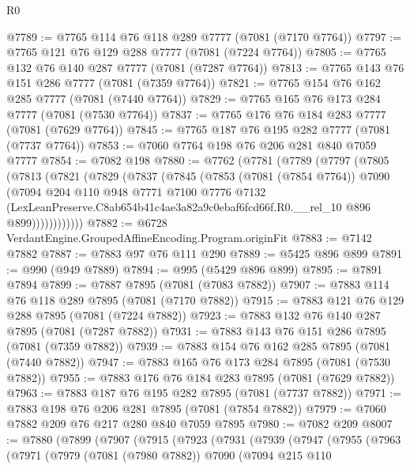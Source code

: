 \begin{lexlean}{R0}
\begin{coremodule}
@7789 := @7765 @114 @76 @118 @289 @7777 (@7081 (@7170 @7764))
@7797 := @7765 @121 @76 @129 @288 @7777 (@7081 (@7224 @7764))
@7805 := @7765 @132 @76 @140 @287 @7777 (@7081 (@7287 @7764))
@7813 := @7765 @143 @76 @151 @286 @7777 (@7081 (@7359 @7764))
@7821 := @7765 @154 @76 @162 @285 @7777 (@7081 (@7440 @7764))
@7829 := @7765 @165 @76 @173 @284 @7777 (@7081 (@7530 @7764))
@7837 := @7765 @176 @76 @184 @283 @7777 (@7081 (@7629 @7764))
@7845 := @7765 @187 @76 @195 @282 @7777 (@7081 (@7737 @7764))
@7853 := @7060 @7764 @198 @76 @206 @281 @840 @7059 @7777
@7854 := @7082 @198
@7880 := @7762
    (@7781
      (@7789
        (@7797
          (@7805
            (@7813
              (@7821
                (@7829
                  (@7837
                    (@7845
                      (@7853
                        (@7081 (@7854 @7764))
                        @7090
                        (@7094
                          @204
                          @110
                          @948
                          @7771
                          @7100
                          @7776
                          @7132
                          (LexLeanPreserve.C8ab654b41c4ae3a82a9c0ebaf6fcd66f.R0.__rel_10
                            @896
                            @899))))))))))))
@7882 := @6728 VerdantEngine.GroupedAffineEncoding.Program.originFit
@7883 := @7142 @7882
@7887 := @7883 @97 @76 @111 @290
@7889 := @5425 @896 @899
@7891 := @990 (@949 @7889)
@7894 := @995 (@5429 @896 @899)
@7895 := @7891 @7894
@7899 := @7887 @7895 (@7081 (@7083 @7882))
@7907 := @7883 @114 @76 @118 @289 @7895 (@7081 (@7170 @7882))
@7915 := @7883 @121 @76 @129 @288 @7895 (@7081 (@7224 @7882))
@7923 := @7883 @132 @76 @140 @287 @7895 (@7081 (@7287 @7882))
@7931 := @7883 @143 @76 @151 @286 @7895 (@7081 (@7359 @7882))
@7939 := @7883 @154 @76 @162 @285 @7895 (@7081 (@7440 @7882))
@7947 := @7883 @165 @76 @173 @284 @7895 (@7081 (@7530 @7882))
@7955 := @7883 @176 @76 @184 @283 @7895 (@7081 (@7629 @7882))
@7963 := @7883 @187 @76 @195 @282 @7895 (@7081 (@7737 @7882))
@7971 := @7883 @198 @76 @206 @281 @7895 (@7081 (@7854 @7882))
@7979 := @7060 @7882 @209 @76 @217 @280 @840 @7059 @7895
@7980 := @7082 @209
@8007 := @7880
    (@7899
      (@7907
        (@7915
          (@7923
            (@7931
              (@7939
                (@7947
                  (@7955
                    (@7963
                      (@7971
                        (@7979
                          (@7081 (@7980 @7882))
                          @7090
                          (@7094
                            @215
                            @110

\end{coremodule}
\end{lexlean}
